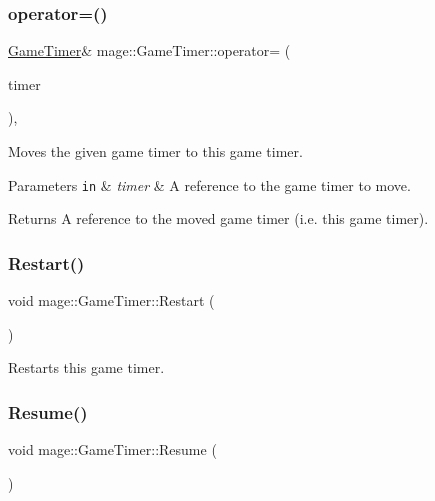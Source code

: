 \subsubsection{\texorpdfstring{operator=()}{operator=()}\hspace{0.1cm}{\footnotesize\ttfamily [2/2]}}
{\footnotesize\ttfamily \hyperlink{classmage_1_1_game_timer}{Game\+Timer}\& mage\+::\+Game\+Timer\+::operator= (\begin{DoxyParamCaption}\item[{\hyperlink{classmage_1_1_game_timer}{Game\+Timer} \&\&}]{timer }\end{DoxyParamCaption})\hspace{0.3cm}{\ttfamily [default]}, {\ttfamily [noexcept]}}

Moves the given game timer to this game timer.


\begin{DoxyParams}[1]{Parameters}
\mbox{\tt in}  & {\em timer} & A reference to the game timer to move. \\
\hline
\end{DoxyParams}
\begin{DoxyReturn}{Returns}
A reference to the moved game timer (i.\+e. this game timer). 
\end{DoxyReturn}
\hypertarget{classmage_1_1_game_timer_a93108b016f2034da39e576067443d265}{}\label{classmage_1_1_game_timer_a93108b016f2034da39e576067443d265} 
\subsubsection{\texorpdfstring{Restart()}{Restart()}}
{\footnotesize\ttfamily void mage\+::\+Game\+Timer\+::\+Restart (\begin{DoxyParamCaption}{ }\end{DoxyParamCaption})\hspace{0.3cm}{\ttfamily [noexcept]}}

Restarts this game timer. \hypertarget{classmage_1_1_game_timer_adbc9ce04e6c7f53f0b5ea6b5ce79a288}{}\label{classmage_1_1_game_timer_adbc9ce04e6c7f53f0b5ea6b5ce79a288} 
\subsubsection{\texorpdfstring{Resume()}{Resume()}}
{\footnotesize\ttfamily void mage\+::\+Game\+Timer\+::\+Resume (\begin{DoxyParamCaption}{ }\end{DoxyParamCaption})\hspace{0.3cm}{\ttfamily [noexcept]}}

